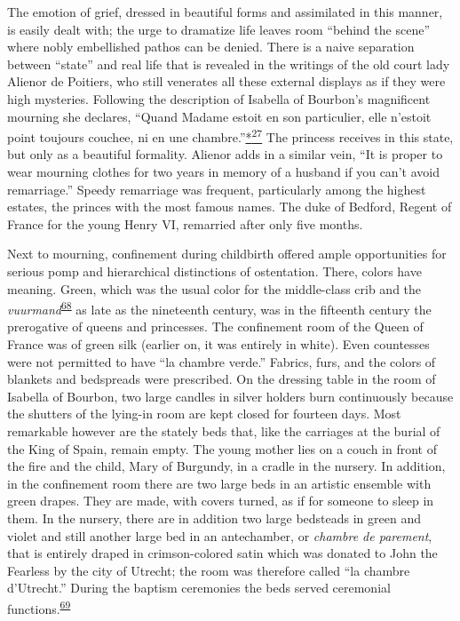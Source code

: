 The emotion of grief, dressed in beautiful forms and assimilated in this
manner, is easily dealt with; the urge to dramatize life leaves room
``behind the scene'' where nobly embellished pathos can be denied. There
is a naive separation between ``state'' and real life that is revealed
in the writings of the old court lady Alienor de Poitiers, who still
venerates all these external displays as if they were high mysteries.
Following the description of Isabella of Bourbon's magnificent mourning
she declares, ``Quand Madame estoit en son particulier, elle n'estoit
point toujours couchee, ni en une
chambre.''\protect\hypertarget{09_Chapter_Two__THE_CRAVING_FOR_A_M.xhtmlux5cux23id_2461}{\protect\hyperlink{23_NOTES.xhtmlux5cux23id_2462}{*\textsuperscript{27}}}
The princess receives in this state, but only as a beautiful formality.
Alienor adds in a similar vein, ``It is proper to wear mourning clothes
for two years in memory of a husband if you can't avoid remarriage.''
Speedy remarriage was frequent, particularly among the highest estates,
the princes with the most famous names. The duke of Bedford, Regent of
France for the young Henry VI, remarried after only five months.

Next to mourning, confinement during childbirth offered ample
opportunities for serious pomp and hierarchical distinctions of
ostentation. There, colors have meaning. Green, which was the usual
color for the middle-class crib and the
\emph{vuurmand}\textsuperscript{\protect\hypertarget{09_Chapter_Two__THE_CRAVING_FOR_A_M.xhtmlux5cux23id_1953}{\protect\hyperlink{23_NOTES.xhtmlux5cux23page_404}{68}}}
as late as the nineteenth century, was in the fifteenth century the
prerogative of queens and princesses. The confinement room of the Queen
of France was of green silk (earlier on, it was entirely in white). Even
countesses were not permitted to have ``la chambre verde.'' Fabrics,
\protect\hypertarget{09_Chapter_Two__THE_CRAVING_FOR_A_M.xhtmlux5cux23page_58}{}{}furs,
and the colors of blankets and bedspreads were prescribed. On the
dressing table in the room of Isabella of Bourbon, two large candles in
silver holders burn continuously because the shutters of the lying-in
room are kept closed for fourteen days. Most remarkable however are the
stately beds that, like the carriages at the burial of the King of
Spain, remain empty. The young mother lies on a couch in front of the
fire and the child, Mary of Burgundy, in a cradle in the nursery. In
addition, in the confinement room there are two large beds in an
artistic ensemble with green drapes. They are made, with covers turned,
as if for someone to sleep in them. In the nursery, there are in
addition two large bedsteads in green and violet and still another large
bed in an antechamber, or \emph{chambre de parement}, that is entirely
draped in crimson-colored satin which was donated to John the Fearless
by the city of Utrecht; the room was therefore called ``la chambre
d'Utrecht.'' During the baptism ceremonies the beds served ceremonial
functions.\textsuperscript{\protect\hypertarget{09_Chapter_Two__THE_CRAVING_FOR_A_M.xhtmlux5cux23id_1951}{\protect\hyperlink{23_NOTES.xhtmlux5cux23id_1952}{69}}}

